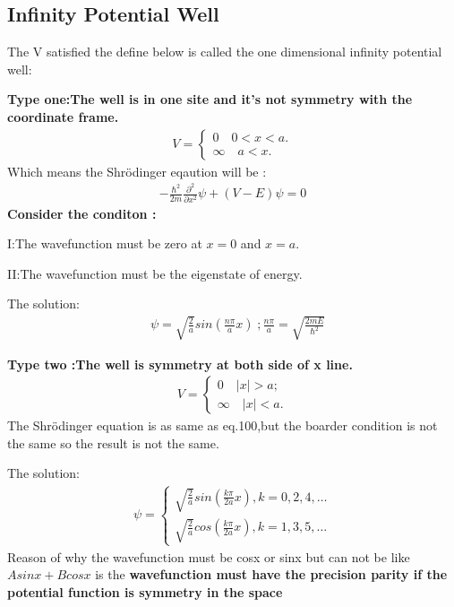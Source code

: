 \documentclass{article}
\begin{document}
\subsection{Infinity Potential Well}
The V satisfied the define below is called the one dimensional infinity potential well:

\textbf{Type one:The well is in one site and it's not symmetry with the coordinate frame.}
\begin{align}
  V=\begin{cases}
    0\quad0<x<a.\\
    \infty\quad a<x.
    \end{cases}
\end{align}
Which means the Shr\"odinger eqaution will be :\begin{align}
  -\frac{\hbar^2}{2m}\frac{ \partial ^2}{ \partial x^2}\psi+(V-E)\psi=0
\end{align}
\textbf{Consider the conditon :}
\begin{center}
I:The wavefunction must be zero at $x=0$ and $x=a$.

II:The wavefunction must be the eigenstate of energy.
\end{center}
The solution:
\begin{align}
&\psi=\sqrt{\frac{2}a}sin(\frac{n\pi}{a}x)\;;\frac{n\pi}a=\sqrt{\frac{2mE}{\hbar^2}}
\end{align}

\textbf{Type two :The well is symmetry at both side of x line.}
\begin{align}
  V=\begin{cases}
0\quad|x|>a;\\
\infty\quad|x|<a.
  \end{cases}
\end{align}
The Shr\"odinger equation is as same as eq.100,but the boarder condition is not the same so the result is not the same.

The solution:
\begin{align}
  \psi=\begin{cases}
    \sqrt{\frac2a}sin(\frac{k\pi}{2a}x),k=0,2,4,\dots\\
    \sqrt{\frac2a}cos(\frac{k\pi}{2a}x),k=1,3,5,\dots
  \end{cases}
\end{align}
Reason of why the wavefunction must be cosx or sinx but can not be like $Asinx+Bcosx$ is the \textbf{wavefunction must have the precision parity if the potential function is symmetry in the space}
\end{document}
